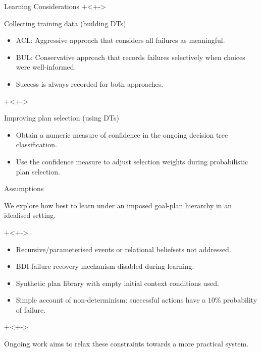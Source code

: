 \documentclass[]{beamer}
\begin{document}
\begin{frame}{Learning Considerations}
\onslide+<+->
\begin{block}{Collecting training data (building DTs)}
\begin{itemize}
\item<+-> \alert{ACL}: Aggressive approach that considers all failures as meaningful.
\item<+-> \alert{BUL}: Conservative approach that records failures selectively when choices were well-informed.
\item<+-> Success is always recorded for both approaches.
\end{itemize}
\end{block}
\onslide+<+->
\begin{block}{Improving plan selection (using DTs)}
\begin{itemize}
\item<+-> Obtain a numeric measure of \alert{confidence} in the ongoing decision tree classification.
\item<+-> Use the confidence measure to \alert{adjust selection weights} during probabilistic plan selection. 
\end{itemize}
\end{block}
\end{frame}

\begin{frame}{Assumptions}
\begin{block}{}
We explore how best to learn under an \alert{imposed goal-plan hierarchy} in an idealised setting.
\end{block}
\onslide+<+->
\begin{block}{}
\begin{itemize}
\item<+-> Recursive/parameterised events or relational beliefsets not addressed.
\item<+-> BDI failure recovery mechanism disabled during learning.
\item<+-> Synthetic plan library with empty initial context conditions used.
\item<+-> Simple account of non-determinism: successful actions have a $10\%$ probability of failure.
\end{itemize}
\end{block}
\onslide+<+->
\begin{block}{}
Ongoing work aims to relax these constraints towards a more practical system.
\end{block}


\end{frame}
\end{document}
